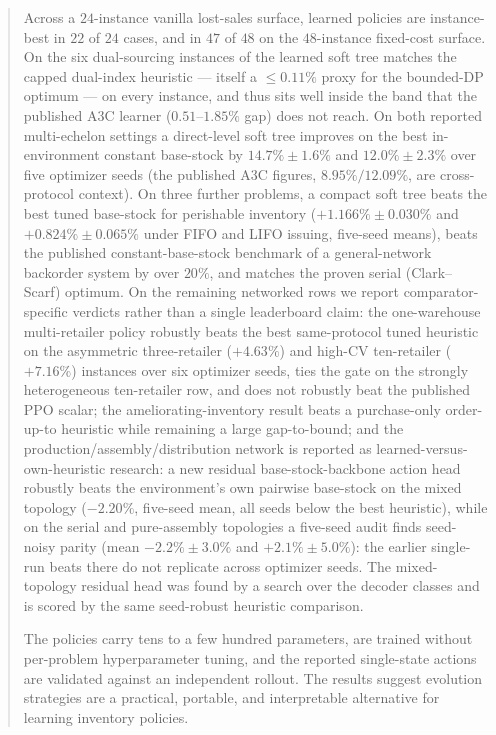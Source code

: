 \documentclass[11pt]{article}
\begin{document}
\begin{abstract}
Across a $24$-instance vanilla lost-sales
surface, learned policies are instance-best in $22$ of $24$ cases, and in $47$ of $48$ on the
$48$-instance fixed-cost surface. On the six dual-sourcing instances of \citet{gijsbrechts2022drl}
the learned soft tree matches the capped dual-index heuristic --- itself a $\le0.11\%$ proxy for the
bounded-DP optimum --- on every instance, and thus sits well inside the band that the published A3C
learner ($0.51$--$1.85\%$ gap) does not reach. On both reported multi-echelon settings a
direct-level soft tree improves on the best in-environment constant base-stock by $14.7\%\pm1.6\%$ and
$12.0\%\pm2.3\%$ over five optimizer seeds (the published A3C figures, $8.95\%/12.09\%$, are
cross-protocol context). On
three further problems, a compact soft tree beats the best tuned base-stock for perishable inventory
($+1.166\%\pm0.030\%$ and $+0.824\%\pm0.065\%$ under FIFO and LIFO issuing, five-seed means), beats the published constant-base-stock
benchmark of a general-network backorder system by over $20\%$, and matches the proven serial
(Clark--Scarf) optimum.
On the remaining networked rows we report comparator-specific verdicts rather than a single
leaderboard claim: the one-warehouse multi-retailer policy robustly beats the best same-protocol tuned
heuristic on the asymmetric three-retailer ($+4.63\%$) and high-CV ten-retailer ($+7.16\%$) instances
over six optimizer seeds, ties the gate on the strongly heterogeneous ten-retailer row, and does not
robustly beat the published PPO scalar; the ameliorating-inventory result beats a purchase-only order-up-to heuristic while remaining
a large gap-to-bound; and the production/assembly/distribution network is reported as
learned-versus-own-heuristic research: a new residual base-stock-backbone action head robustly beats
the environment's own pairwise base-stock on the mixed topology ($-2.20\%$, five-seed mean, all seeds
below the best heuristic), while on the serial and pure-assembly topologies a five-seed audit finds
seed-noisy parity (mean $-2.2\%\pm3.0\%$ and $+2.1\%\pm5.0\%$): the earlier single-run beats there do
not replicate across optimizer seeds. The mixed-topology residual head was found by a search over the
decoder classes and is scored by the same seed-robust heuristic comparison.

The policies carry tens to a few hundred parameters, are trained without per-problem hyperparameter
tuning, and the reported single-state actions are validated against an independent rollout. The
results suggest evolution strategies are a practical, portable, and interpretable alternative for
learning inventory policies.
\end{abstract}
\end{document}
